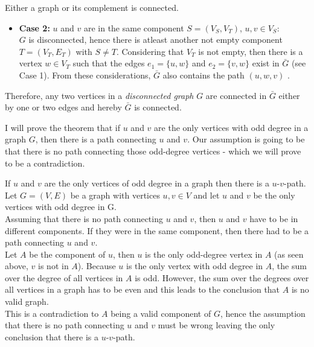 \documentclass[a4paper]{article}
\begin{document}
\begin{solution}{3}
\begin{theorem}{Either a graph or its complement is connected.}
\begin{itemize}
				\item \textbf{Case 2: } $u$ and $v$ are in the same component $S = (V_S, V_T)$, $u, v \in V_S$:\\
					$G$ is disconnected, hence there is atleast another not empty component $T = (V_T, E_T)$ with $S \neq T$. 
					Considering that $V_T$ is not empty, then there is a vertex $w \in V_T$ such that the edges $e_1 = \{u, w\}$ and $e_2 = \{v, w\}$ exist in $\bar{G}$ (see Case 1). From these considerations, $\bar{G}$ also contains the path $(u, w, v)$ .
				\begin{center}
				\end{center}
			\end{itemize}

			Therefore, any two vertices in a \emph{disconnected graph} $G$ are connected in $\bar{G}$ either by one or two edges and hereby $\bar{G}$ is connected.\\
		\end{theorem}
	\end{solution} 
	\newpage
	\begin{solution}{4}
		I will prove the theorem that if $u$ and $v$ are the only vertices with odd degree in a graph $G$, then there is a path connecting $u$ and $v$. Our assumption is going to be that there is no path connecting those odd-degree vertices - which we will prove to be a contradiction.
		\begin{theorem}{If $u$ and $v$ are the only vertices of odd degree in a graph then there is a $u$-$v$-path.}
		Let $G = (V, E)$ be a graph with vertices $u,v \in V$ and let $u$ and $v$ be the only vertices with odd degree in G. \\
		Assuming that there is no path connecting $u$ and $v$, then $u$ and $v$ have to be in different components. If they were in the same component, then there had to be a path connecting $u$ and $v$.\\
		Let $A$ be the component of $u$, then $u$ is the only odd-degree vertex in $A$ (as seen above, $v$ is not in $A$). Because $u$ is the only vertex with odd degree in $A$, the sum over the degree of all vertices in $A$ is odd. However, the sum over the degrees over all vertices in a graph has to be even and this leads to the conclusion that $A$ is no valid graph.\\
		This is a contradiction to $A$ being a valid component of $G$, hence the assumption that there is no path connecting $u$ and $v$ must be wrong leaving the only conclusion that there is a $u$-$v$-path.	
		\end{theorem}
	\end{solution}
\end{document}
